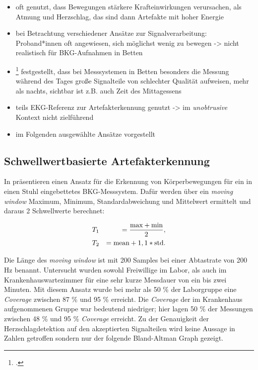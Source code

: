 	\begin{itemize}
		\item oft genutzt, dass Bewegungen stärkere Krafteinwirkungen verursachen, als Atmung und Herzschlag, das sind dann Artefakte mit hoher Energie
		\item bei Betrachtung verschiedener Ansätze zur Signalverarbeitung: Proband*innen oft angewiesen, sich möglichst wenig zu bewegen -> nicht realistisch für BKG-Aufnahmen in Betten
		\item \footcite{HoogAntink2020} festgestellt, dass bei Messsystemen in Betten besonders die Messung während des Tages große Signalteile von schlechter Qualität aufweisen, mehr als nachts, sichtbar ist z.B. auch Zeit des Mittagessens
		\item teils EKG-Referenz zur Artefakterkennung genutzt -> im \textit{unobtrusive} Kontext nicht zielführend
		\item im Folgenden ausgewählte Ansätze vorgestellt
	\end{itemize}

	\subsection{Schwellwertbasierte Artefakterkennung}
	
	In  präsentieren \citeauthor{Pino2015} einen Ansatz für die Erkennung von Körperbewegungen für ein in einen Stuhl eingebettetes \ac{BKG}-Messsystem. Dafür werden über ein \textit{moving window} Maximum, Minimum, Standardabweichung und Mittelwert ermittelt und daraus 2 Schwellwerte berechnet:
	
	\begin{eqnarray*}
		&T_1 &= \frac{\text{max} + \text{min}}{2},\notag\\
		&T_2 &= \text{mean} + 1,1 * \text{std}.\notag
	\end{eqnarray*}
	
	Die Länge des \textit{moving window} ist mit 200 Samples bei einer Abtastrate von 200 Hz benannt. Untersucht wurden sowohl Freiwillige im Labor, als auch im Krankenhauswartezimmer für eine sehr kurze Messdauer von ein bis zwei Minuten. Mit diesem Ansatz wurde bei mehr als 50 \% der Laborgruppe eine \textit{Coverage} zwischen 87 \% und 95 \% erreicht. Die \textit{Coverage} der im Krankenhaus aufgenommenen Gruppe war bedeutend niedriger; hier lagen 50 \% der Messungen zwischen 48 \% und 95 \% \textit{Coverage} erreicht. Zu der Genauigkeit der Herzschlagdetektion auf den akzeptierten Signalteilen wird keine Aussage in Zahlen getroffen sondern nur der folgende Bland-Altman Graph gezeigt.
	
